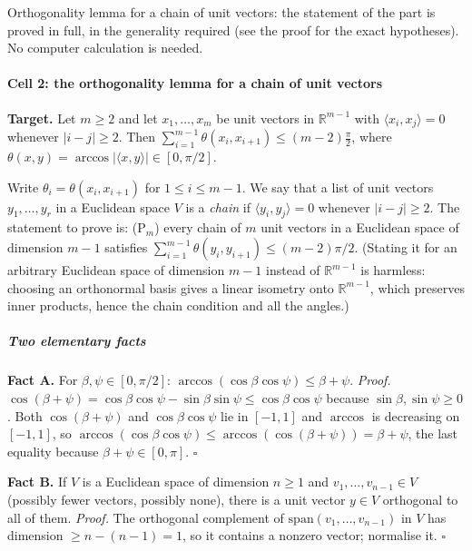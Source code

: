 
Orthogonality lemma for a chain of unit vectors: the statement of the
part is proved in full, in the generality required (see the proof for
the exact hypotheses). No computer calculation is needed.


\paragraph{Cell 2: the orthogonality lemma for a chain of unit
vectors}\label{cell-2-the-orthogonality-lemma-for-a-chain-of-unit-vectors}

\textbf{Target.} Let \(m\ge2\) and let \(x_1,\dots,x_m\) be unit vectors
in \(\mathbb R^{m-1}\) with \(\langle x_i,x_j\rangle=0\) whenever
\(|i-j|\ge2\). Then
\(\sum_{i=1}^{m-1}\theta(x_i,x_{i+1})\le(m-2)\frac{\pi}{2}\), where
\(\theta(x,y)=\arccos|\langle x,y\rangle|\in[0,\pi/2]\).

Write \(\theta_i=\theta(x_i,x_{i+1})\) for \(1\le i\le m-1\). We say
that a list of unit vectors \(y_1,\dots,y_r\) in a Euclidean space \(V\)
is a \emph{chain} if \(\langle y_i,y_j\rangle=0\) whenever
\(|i-j|\ge2\). The statement to prove is: (P\(_m\)) every chain of \(m\)
unit vectors in a Euclidean space of dimension \(m-1\) satisfies
\(\sum_{i=1}^{m-1}\theta(y_i,y_{i+1})\le(m-2)\pi/2\). (Stating it for an
arbitrary Euclidean space of dimension \(m-1\) instead of
\(\mathbb R^{m-1}\) is harmless: choosing an orthonormal basis gives a
linear isometry onto \(\mathbb R^{m-1}\), which preserves inner
products, hence the chain condition and all the angles.)

\subparagraph{Two elementary facts}\label{two-elementary-facts}

\textbf{Fact A.} For \(\beta,\psi\in[0,\pi/2]\):
\(\arccos(\cos\beta\cos\psi)\le\beta+\psi\). \emph{Proof.}
\(\cos(\beta+\psi)=\cos\beta\cos\psi-\sin\beta\sin\psi\le\cos\beta\cos\psi\)
because \(\sin\beta,\sin\psi\ge0\). Both \(\cos(\beta+\psi)\) and
\(\cos\beta\cos\psi\) lie in \([-1,1]\) and \(\arccos\) is decreasing on
\([-1,1]\), so
\(\arccos(\cos\beta\cos\psi)\le\arccos(\cos(\beta+\psi))=\beta+\psi\),
the last equality because \(\beta+\psi\in[0,\pi]\). \(\square\)

\textbf{Fact B.} If \(V\) is a Euclidean space of dimension \(n\ge1\)
and \(v_1,\dots,v_{n-1}\in V\) (possibly fewer vectors, possibly none),
there is a unit vector \(y\in V\) orthogonal to all of them.
\emph{Proof.} The orthogonal complement of
\(\mathrm{span}(v_1,\dots,v_{n-1})\) in \(V\) has dimension
\(\ge n-(n-1)=1\), so it contains a nonzero vector; normalise it.
\(\square\)

